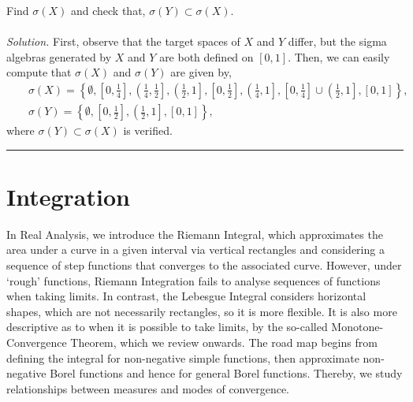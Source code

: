 \documentclass{article}
\begin{document}
Find $\sigma(X)$ and check that, $\sigma(Y) \subset \sigma(X)$. \\\\
\textit{Solution.} First, observe that the target spaces of $X$ and $Y$ differ, but the sigma algebras generated by $X$ and $Y$ are both defined on $[0,1]$. Then, we can easily compute that $\sigma(X)$ and $\sigma(Y)$ are given by,
\begin{eqnarray}
	\nonumber
	&&\sigma(X) = \left\{\emptyset, \left[0,\frac{1}{4}\right], \left(\frac{1}{4},\frac{1}{2}\right], \left(\frac{1}{2},1\right], \left[0,\frac{1}{2}\right], \left(\frac{1}{4},1\right], \left[0,\frac{1}{4}\right] \cup \left(\frac{1}{2},1\right], [0,1]\right\},\\
	\nonumber
	&{}&\sigma(Y) = \left\{\emptyset, \left[0,\frac{1}{2}\right], \left(\frac{1}{2},1\right], [0,1]\right\},
\end{eqnarray}
where $\sigma(Y) \subset \sigma(X)$ is verified.
\begin{center}
	\noindent\rule{12cm}{0.4pt}
\end{center}
\newpage
\section{Integration}
In Real Analysis, we introduce the Riemann Integral, which approximates the area under a curve in a given interval via vertical rectangles and considering a sequence of step functions that converges to the associated curve. However, under ‘rough’ functions, Riemann Integration fails to analyse sequences of functions when taking limits. In contrast, the Lebesgue Integral considers horizontal shapes, which are not necessarily rectangles, so it is more flexible. It is also more descriptive as to when it is possible to take limits, by the so-called Monotone-Convergence Theorem, which we review onwards. The road map begins from defining the integral for non-negative simple functions, then approximate non-negative Borel functions and hence for general Borel functions. Thereby, we study relationships between measures and modes of convergence.
\end{document}
